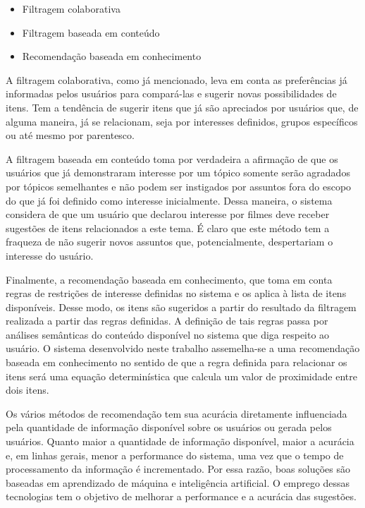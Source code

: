 \begin{itemize}
\item Filtragem colaborativa
\item Filtragem baseada em conteúdo
\item Recomendação baseada em conhecimento
\end{itemize}

A filtragem colaborativa, como já mencionado, leva em conta as preferências já informadas pelos usuários para compará-las e sugerir novas possibilidades de itens. Tem a tendência de sugerir itens que já são apreciados por usuários que, de alguma maneira, já se relacionam, seja por interesses definidos, grupos específicos ou até mesmo por parentesco.

A filtragem baseada em conteúdo toma por verdadeira a afirmação de que os usuários que já demonstraram interesse por um tópico somente serão agradados por tópicos semelhantes e não podem ser instigados por assuntos fora do escopo do que já foi definido como interesse inicialmente. Dessa maneira, o sistema considera de que um usuário que declarou interesse por filmes deve receber sugestões de itens relacionados a este tema. É claro que este método tem a fraqueza de não sugerir novos assuntos que, potencialmente, despertariam o interesse do usuário.

Finalmente, a recomendação baseada em conhecimento,  que toma em conta regras de restrições de interesse definidas no sistema e os aplica à lista de itens disponíveis. Desse modo, os itens são sugeridos a partir do resultado da filtragem realizada a partir das regras definidas. A definição de tais regras passa por análises semânticas do conteúdo disponível no sistema que diga respeito ao usuário. O sistema desenvolvido neste trabalho assemelha-se a uma recomendação baseada em conhecimento no sentido de que a regra definida para relacionar os itens será uma equação determinística que calcula um valor de proximidade entre dois itens.

Os vários métodos de recomendação tem sua acurácia diretamente influenciada pela quantidade de informação disponível sobre os usuários ou gerada pelos usuários. Quanto maior a quantidade de informação disponível, maior a acurácia e, em linhas gerais, menor a performance do sistema, uma vez que o tempo de processamento da informação é incrementado. Por essa razão, boas soluções são baseadas em aprendizado de máquina e inteligência artificial. O emprego dessas tecnologias tem o objetivo de melhorar a performance e a acurácia das sugestões.

